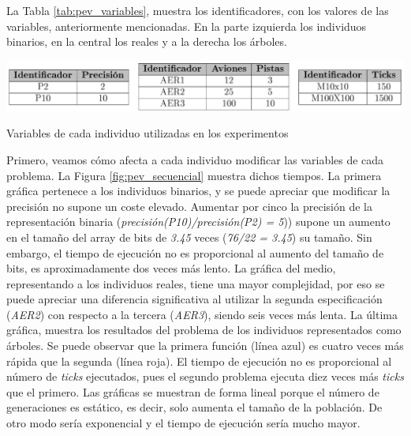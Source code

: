 	
	
		La Tabla \ref{tab:pev_variables}, muestra los identificadores, con los valores de las variables, anteriormente mencionadas. En la parte izquierda los individuos binarios, en la central los reales y a la derecha los árboles.
		
		\begin{table}[!h]
			\centering
			\includegraphics[width=1\textwidth]{images/chapter_4/tab_pev_variables}		
			\caption{Variables de cada individuo utilizadas en los experimentos}
			\label{tab:pev_variables}
		\end{table}		
	
			
		Primero, veamos cómo afecta a cada individuo modificar las variables de cada problema. La Figura \ref{fig:pev_secuencial} muestra dichos tiempos. La primera gráfica pertenece a los individuos binarios, y se puede apreciar que modificar la precisión no supone un coste elevado. Aumentar por cinco la precisión de la representación binaria (\textit{precisión(P10)/precisión(P2) = 5})) supone un aumento en el tamaño del array de bits de \textit{3.45} veces (\textit{76/22 = 3.45}) su tamaño. Sin embargo, el tiempo de ejecución no es proporcional al aumento del tamaño de bits, es aproximadamente dos veces más lento.	La gráfica del medio, representando a los individuos reales, tiene una mayor complejidad, por eso se puede apreciar una diferencia significativa al utilizar la segunda especificación (\textit{AER2}) con respecto a la tercera (\textit{AER3}), siendo seis veces más lenta. La última gráfica, muestra los resultados del problema de los individuos representados como árboles. Se puede observar que la primera función (línea azul) es cuatro veces más rápida que la segunda (línea roja). El tiempo de ejecución no es proporcional al número de \textit{ticks} ejecutados, pues el segundo problema ejecuta diez veces más \textit{ticks} que el primero. Las gráficas se muestran de forma lineal porque el número de generaciones es estático, es decir, solo aumenta el tamaño de la población. De otro modo sería exponencial y el tiempo de ejecución sería mucho mayor. 
	
